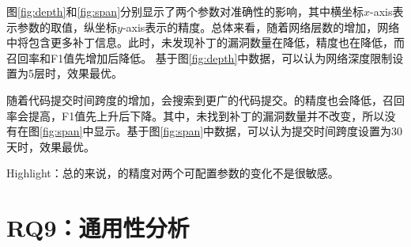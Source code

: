 图\ref{fig:depth}和\ref{fig:span}分别显示了两个参数对\tool 准确性的影响，其中横坐标$x$-axis表示参数的取值，纵坐标$y$-axis表示\tool 的精度。总体来看，随着网络层数的增加，网络中将包含更多补丁信息。此时，\tool 未发现补丁的漏洞数量在降低，精度也在降低，而召回率和F1值先增加后降低。
基于图\ref{fig:depth}中数据，可以认为网络深度限制设置为5层时，\tool 效果最优。

随着代码提交时间跨度的增加，\tool 会搜索到更广的代码提交。\tool 的精度也会降低，召回率会提高，F1值先上升后下降。其中，\tool 未找到补丁的漏洞数量并不改变，所以没有在图\ref{fig:span}中显示。基于图\ref{fig:span}中数据，可以认为提交时间跨度设置为30天时，\tool 效果最优。

\begin{tcolorbox}[size=title,opacityfill=0.15]
Highlight：总的来说，\tool 的精度对两个可配置参数的变化不是很敏感。
\end{tcolorbox}

\section{RQ9：通用性分析}\label{sec:generality}


